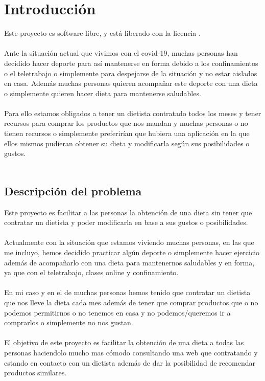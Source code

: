 \chapter{Introducción}

Este proyecto es software libre, y está liberado con la licencia \cite{gplv3}.
\\\\
Ante la situación actual que vivimos con el covid-19, muchas personas han decidido 
hacer deporte para así mantenerse en forma debido a los confinamientos
o el teletrabajo o simplemente para despejarse de la situación y no estar aislados en casa. 
Además muchas personas quieren acompañar este deporte con una dieta o simplemente quieren hacer 
dieta para mantenerse saludables.
\\\\
Para ello estamos obligados a tener un dietista contratado todos los meses y tener recursos para 
comprar los productos que nos mandan y muchas personas o no tienen recursos o simplemente preferirían
que hubiera una aplicación en la que ellos mismos pudieran obtener su dieta y modificarla según sus 
posibilidades o gustos.
\\\\

\section{Descripción del problema}

Este proyecto es facilitar a las personas la obtención de una dieta sin tener que 
contratar un dietista y poder modificarla en base a sus gustos o posibilidades.
\\\\
Actualmente con la situación que estamos viviendo muchas personas, en las que me incluyo, hemos 
decidido practicar algún deporte o simplemente hacer ejercicio además de acompañarlo con una dieta 
para mantenernos saludables y en forma, ya que con el teletrabajo, clases online y confinamiento.
\\\\
En mi caso y en el de muchas personas hemos tenido que contratar un dietista que nos lleve la dieta 
cada mes además de tener que comprar productos que o no podemos permitirnos o no tenemos en casa y no 
podemos/queremos ir a comprarlos o simplemente no nos gustan.
\\\\
El objetivo de este proyecto es facilitar la obtención de una dieta a todas las personas haciendolo mucho 
mas cómodo consultando una web que contratando y estando en contacto con un dietista además de dar la posibilidad 
de recomendar productos similares.


